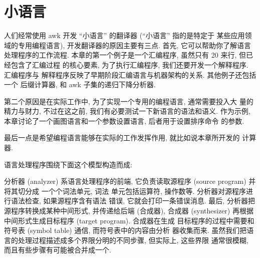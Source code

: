 \chapter{小语言}
\label{chap:little_languages}

人们经常使用 awk 开发 ``小语言'' 的翻译器 (``小语言'' 指的是特定于
某些应用领域的专用编程语言),
开发翻译器的原因主要有三点. 首先, 它可以帮助你了解语言处理程序的工作流程.
本章的第一个例子是一个汇编程序, 虽然只有 20 来行, 但已经包含了汇编过程
的核心要素, 为了执行汇编程序, 我们还要开发一个解释程序. 汇编程序与
解释程序反映了早期阶段汇编语言与机器架构的关系. 其他例子还包括一个
后缀计算器, 和 awk 子集的递归下降分析器.

第二个原因是在实际工作中, 为了实现一个专用的编程语言, 通常需要投入大
量的精力与财力, 不过在这之前, 我们有必要测试一下新语言的语法和语义.
作为示例, 本章讨论了一个画图语言和一个参数设置语言, 后者用于设置排序命令
的参数.

最后一点是希望编程语言能够在实际的工作发挥作用, 就比如说本章所开发的
计算器.

语言处理程序围绕下面这个模型构造而成:
\begin{center}
\end{center}

分析器 (analyzer) 系语言处理程序的前端, 它负责读取源程序 (source program)
并将其切分成 一个个词法单元, 词法
单元包括运算符, 操作数等. 分析器对源程序进行语法检查, 如果源程序含有语法
错误, 它就会打印一条错误消息. 最后, 分析器把源程序转换成某种中间形式,
并传递给后端 (合成器), 合成器 (synthesizer) 再根据中间形式生成目标程序
(target program). 合成器在生成
目标程序的过程中需要和符号表 (symbol table) 通信, 而符号表中的内容由分析
器收集而来.
虽然我们把语言的处理过程描述成多个界限分明的不同步骤, 但实际上, 这些界限
通常很模糊, 而且有些步骤有可能被合并成一个.

